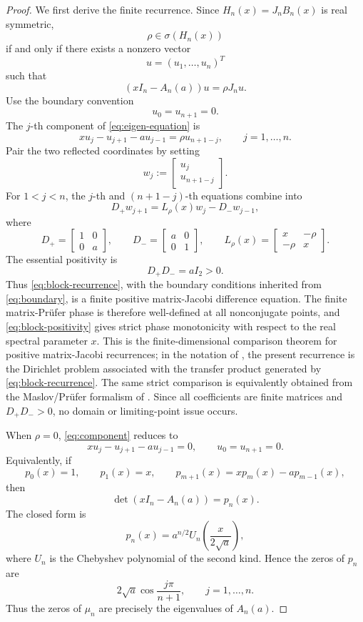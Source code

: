 \documentclass[11pt]{amsart}
\numberwithin{equation}{section}
\newcommand{\A}{A}
\newcommand{\B}{B}
\newcommand{\J}{J}
\begin{document}
\begin{proof}
We first derive the finite recurrence.  Since \(H_n(x)=\J_n\B_n(x)\) is real symmetric,
\[
\rho\in\sigma(H_n(x))
\]
if and only if there exists a nonzero vector
\[
u=(u_1,\dots,u_n)^T
\]
such that
\[
(xI_n-\A_n(a))u=\rho \J_nu.
\tag{3.7}\label{eq:eigen-equation}
\]
Use the boundary convention
\[
u_0=u_{n+1}=0.
\tag{3.8}\label{eq:boundary}
\]
The \(j\)-th component of \eqref{eq:eigen-equation} is
\[
xu_j-u_{j+1}-a u_{j-1}
=
\rho u_{n+1-j},
\qquad j=1,\dots,n.
\tag{3.9}\label{eq:component}
\]
Pair the two reflected coordinates by setting
\[
w_j:=
\begin{bmatrix}
u_j\\
u_{n+1-j}
\end{bmatrix}.
\]
For \(1<j<n\), the \(j\)-th and \((n+1-j)\)-th equations combine into
\[
D_+w_{j+1}
=
L_\rho(x)w_j-D_-w_{j-1},
\tag{3.10}\label{eq:block-recurrence}
\]
where
\[
D_+
=
\begin{bmatrix}
1&0\\
0&a
\end{bmatrix},
\qquad
D_-
=
\begin{bmatrix}
a&0\\
0&1
\end{bmatrix},
\qquad
L_\rho(x)
=
\begin{bmatrix}
x&-\rho\\
-\rho&x
\end{bmatrix}.
\tag{3.11}\label{eq:block-coefficients}
\]
The essential positivity is
\[
D_+D_-=aI_2>0.
\tag{3.12}\label{eq:block-positivity}
\]
Thus \eqref{eq:block-recurrence}, with the boundary conditions inherited from \eqref{eq:boundary}, is a finite positive matrix-Jacobi difference equation.  The finite matrix-Pr\"ufer phase is therefore well-defined at all nonconjugate points, and \eqref{eq:block-positivity} gives strict phase monotonicity with respect to the real spectral parameter \(x\).  This is the finite-dimensional comparison theorem for positive matrix-Jacobi recurrences; in the notation of \cite[Ch.~4]{Teschl2000}, the present recurrence is the Dirichlet problem associated with the transfer product generated by \eqref{eq:block-recurrence}.  The same strict comparison is equivalently obtained from the Maslov/Pr\"ufer formalism of \cite[Secs.~2--3]{SchulzBaldesUrban2020}.  Since all coefficients are finite matrices and \(D_+D_->0\), no domain or limiting-point issue occurs.

When \(\rho=0\), \eqref{eq:component} reduces to
\[
xu_j-u_{j+1}-a u_{j-1}=0,\qquad u_0=u_{n+1}=0.
\tag{3.13}\label{eq:rho-zero}
\]
Equivalently, if
\[
p_0(x)=1,\qquad p_1(x)=x,\qquad
p_{m+1}(x)=xp_m(x)-a p_{m-1}(x),
\tag{3.14}\label{eq:p-recurrence}
\]
then
\[
\det(xI_n-\A_n(a))=p_n(x).
\tag{3.15}
\]
The closed form is
\[
p_n(x)=a^{n/2}U_n\!\left(\frac{x}{2\sqrt a}\right),
\tag{3.16}
\]
where \(U_n\) is the Chebyshev polynomial of the second kind.  Hence the zeros of \(p_n\) are
\[
2\sqrt a\cos\frac{j\pi}{n+1},
\qquad j=1,\dots,n.
\tag{3.17}
\]
Thus the zeros of \(\mu_n\) are precisely the eigenvalues of \(\A_n(a)\).


\end{proof}
\end{document}
